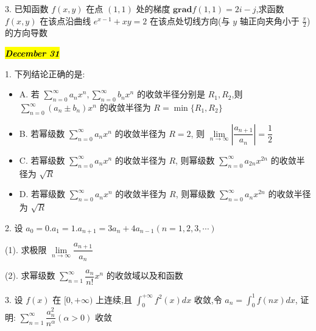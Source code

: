 3. 已知函数 $f(x,y)$ 在点 $(1,1)$ 处的梯度 $\mathbf{grad} f(1,1)=2i-j$,求函数 $f(x,y)$ 在该点沿曲线 $e^{x-1}+xy=2$ 在该点处切线方向(与 $y$ 轴正向夹角小于 $\frac{\pi}{2}$)的方向导数
\begin{solution}
	
\end{solution}

\hl{\textbf{\textit{December 31}}}

1. 下列结论正确的是:
\begin{itemize}
	\item A. 若 $\sum\limits_{n=0}^{\infty}a_{n}x^{n},\sum\limits_{n=0}^{\infty}b_{n}x^{n}$ 的收敛半径分别是 $R_{1},R_{2}$,则 $\sum\limits_{n=0}^{\infty}(a_{n}\pm b_{n})x^{n}$ 的收敛半径为 $R=\min\{R_{1},R_{2}\}$
	\item B. 若幂级数 $\sum\limits_{n=0}^{\infty}a_{n}x^{n}$ 的收敛半径为 $R=2$, 则 $\lim\limits_{n\to\infty}|\dfrac{a_{n+1}}{a_{n}}|=\dfrac{1}{2}$
	\item C. 若幂级数 $\sum\limits_{n=0}^{\infty}a_{n}x^{n}$ 的收敛半径为 $R$, 则幂级数 $\sum\limits_{n=0}^{\infty}a_{2n}x^{2n}$ 的收敛半径为 $\sqrt{R}$
	\item D. 若幂级数 $\sum\limits_{n=0}^{\infty}a_{n}x^{n}$ 的收敛半径为 $R$, 则幂级数 $\sum\limits_{n=0}^{\infty}a_{n}x^{2n}$ 的收敛半径为 $\sqrt{R}$
\end{itemize}
\begin{solution}
	
\end{solution}

2. 设 $a_{0}=0.a_{1}=1.a_{n+1}=3a_{n}+4a_{n-1}(n=1,2,3,\cdots)$

(1). 求极限 $\lim\limits_{n\to\infty}\dfrac{a_{n+1}}{a_{n}}$

(2). 求幂级数 $\sum\limits_{n=1}^{\infty}\dfrac{a_{n}}{n!}x^{n}$ 的收敛域以及和函数
\begin{solution}
	
\end{solution}


3. 设 $f(x)$ 在 $[0,+\infty)$ 上连续,且 $\displaystyle{\int_{0}^{+\infty}f^{2}(x)dx}$ 收敛,令 $\displaystyle{a_{n}=\int_{0}^{1}f(nx)dx}$,
证明: $\sum\limits_{n=1}^{\infty}\dfrac{a_{n}^{2}}{n^{\alpha}}(\alpha>0)$ 收敛
\begin{solution}
	
\end{solution}

